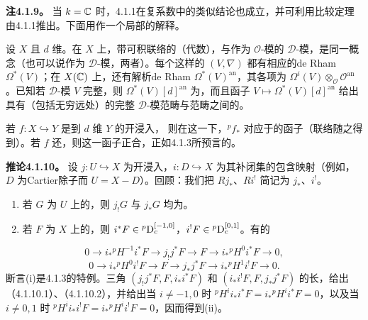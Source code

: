 \par\medskip\noindent\textbf{注4.1.9。} 当 $k=\mathbb C$ 时，4.1.1在复系数中的类似结论也成立，并可利用比较定理由4.1.1推出。下面用作一个局部的解释。

设 $X$ 且 $d$ 维。在 $X$ 上，带可积联络的（代数），与作为 $\mathcal O$-模的 $\mathscr D$-模，是同一概念（也可以说作为 $\mathscr D$-模，两者）。每个这样的 $(V,\nabla)$ 都有相应的de Rham $\Omega^*(V)$；在 $X(\mathbb C)$ 上，还有解析de Rham $\Omega^*(V)^{\mathrm{an}}$，其各项为 $\Omega^i(V)\otimes_{\mathcal O}\mathcal O^{\mathrm{an}}$。已知若 $\mathscr D$-模 $V$ 完整，则 $\Omega^*(V)[d]^{\mathrm{an}}$ 为，而且函子 $V\mapsto\Omega^*(V)[d]^{\mathrm{an}}$ 给出具有（包括无穷远处）的完整 $\mathscr D$-模范畴与范畴之间的。

若 $f:X\hookrightarrow Y$ 是到 $d$ 维 $Y$ 的开浸入，
则在这一下，${}^pf_*$ 对应于的函子（联络随之得到）。若 $f$ 还，则这一函子正合，正如4.1.3所预言的。

\par\medskip\noindent\textbf{推论4.1.10。} 设 $j:U\hookrightarrow X$ 为开浸入，$i:D\hookrightarrow X$ 为其补闭集的包含映射（例如，$D$ 为Cartier除子而 $U=X-D$）。回顾：我们把 $Rj_*$、$Ri^!$ 简记为 $j_*$、$i^!$。
\begin{enumerate}[label=(\roman*)]
\item 若 $G$ 为 $U$ 上的，则 $j_!G$ 与 $j_*G$ 均为。
\item 若 $F$ 为 $X$ 上的，则 $i^*F\in{}^p\mathrm{D}_c^{[-1,0]}$，$i^!F\in{}^p\mathrm{D}_c^{[0,1]}$。有的
\end{enumerate}
\begin{equation*}0\longrightarrow i_*{}^pH^{-1}i^*F\longrightarrow j_!j^*F\longrightarrow F\longrightarrow i_*{}^pH^0i^*F\longrightarrow0,\tag{4.1.10.1}\end{equation*}
\begin{equation*}0\longrightarrow i_*{}^pH^0i^!F\longrightarrow F\longrightarrow j_*j^*F\longrightarrow i_*{}^pH^1i^!F\longrightarrow0.\tag{4.1.10.2}\end{equation*}
断言(i)是4.1.3的特例。三角 $(j_!j^*F,F,i_*i^*F)$ 和 $(i_*i^!F,F,j_*j^*F)$ 的长，给出（4.1.10.1）、（4.1.10.2），并给出当 $i\ne-1,0$ 时 ${}^pH^ii_*i^*F=i_*{}^pH^ii^*F=0$，以及当 $i\ne0,1$ 时 ${}^pH^ii_*i^!F=i_*{}^pH^ii^!F=0$，因而得到(ii)。

